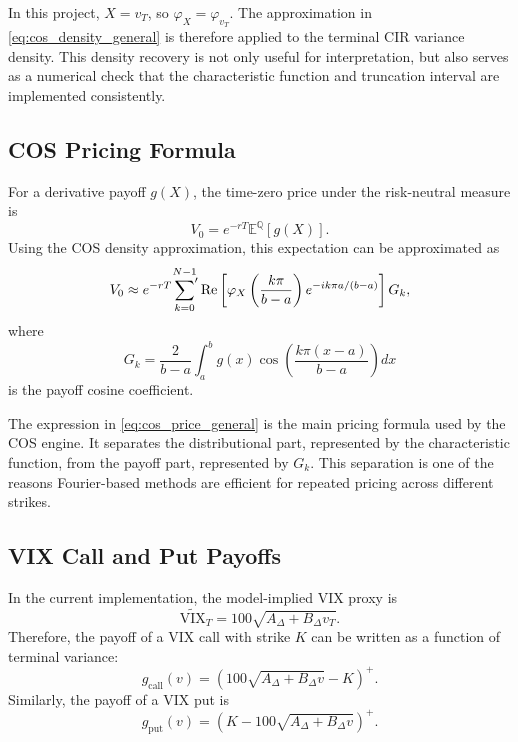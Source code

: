 In this project, \(X=v_T\), so \(\varphi_X=\varphi_{v_T}\). The approximation in \eqref{eq:cos_density_general} is therefore applied to the terminal CIR variance density. This density recovery is not only useful for interpretation, but also serves as a numerical check that the characteristic function and truncation interval are implemented consistently.

\subsection{COS Pricing Formula}

For a derivative payoff \(g(X)\), the time-zero price under the risk-neutral measure is
\begin{equation}
V_0
=
e^{-rT}
\mathbb{E}^{\mathbb{Q}}[g(X)].
\end{equation}
Using the COS density approximation, this expectation can be approximated as
\begin{equation}
V_0
\approx
e^{-rT}
\sideset{}{'}\sum_{k=0}^{N-1}
\operatorname{Re}
\left[
\varphi_X\left(\frac{k\pi}{b-a}\right)
e^{-ik\pi a/(b-a)}
\right]
G_k,
\label{eq:cos_price_general}
\end{equation}
where
\begin{equation}
G_k
=
\frac{2}{b-a}
\int_a^b
g(x)
\cos\left(
\frac{k\pi(x-a)}{b-a}
\right)
dx
\label{eq:cos_payoff_coefficient}
\end{equation}
is the payoff cosine coefficient.

The expression in \eqref{eq:cos_price_general} is the main pricing formula used by the COS engine. It separates the distributional part, represented by the characteristic function, from the payoff part, represented by \(G_k\). This separation is one of the reasons Fourier-based methods are efficient for repeated pricing across different strikes.

\subsection{VIX Call and Put Payoffs}

In the current implementation, the model-implied VIX proxy is
\begin{equation}
\widetilde{\mathrm{VIX}}_T
=
100\sqrt{A_\Delta+B_\Delta v_T}.
\end{equation}
Therefore, the payoff of a VIX call with strike \(K\) can be written as a function of terminal variance:
\begin{equation}
g_{\mathrm{call}}(v)
=
\left(
100\sqrt{A_\Delta+B_\Delta v}-K
\right)^+.
\label{eq:cos_call_payoff}
\end{equation}
Similarly, the payoff of a VIX put is
\begin{equation}
g_{\mathrm{put}}(v)
=
\left(
K-100\sqrt{A_\Delta+B_\Delta v}
\right)^+.
\label{eq:cos_put_payoff}
\end{equation}

